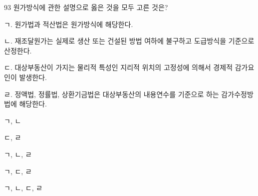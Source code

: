 \begin{question}{93}
원가방식에 관한 설명으로 옳은 것을 모두 고른 것은?
\begin{framedtext}
ㄱ. 원가법과 적산법은 원가방식에 해당한다. \par
ㄴ. 재조달원가는 실제로 생산 또는 건설된 방법 여하에 불구하고 도급방식을 기준으로 산정한다. \par
ㄷ. 대상부동산이 가지는 물리적 특성인 지리적 위치의 고정성에 의해서 경제적 감가요인이 발생한다. \par
ㄹ. 정액법, 정률법, 상환기금법은 대상부동산의 내용연수를 기준으로 하는 감가수정방법에 해당한다. \par
\end{framedtext}
\begin{choices}
  \item ㄱ, ㄴ
  \item ㄷ, ㄹ
  \item ㄱ, ㄴ, ㄹ
  \item ㄱ, ㄷ, ㄹ
  \item ㄱ, ㄴ, ㄷ, ㄹ
\end{choices}
\end{question}
